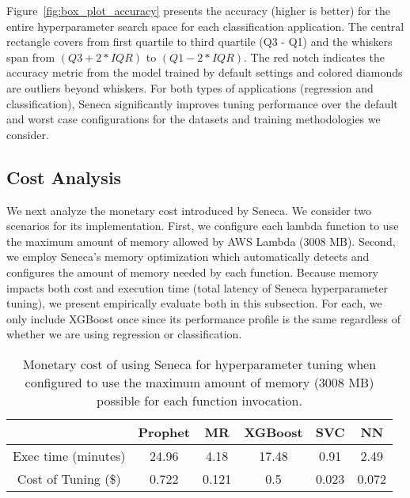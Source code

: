 Figure~\ref{fig:box_plot_accuracy} presents the accuracy (higher is better) 
for the entire hyperparameter search space for each classification
application.  The central rectangle covers from first quartile to third quartile (Q3 - Q1) and the whiskers span from \texttt{$(Q3 + 2 * IQR)$} to \texttt{$(Q1 - 2 * IQR)$}. The red notch indicates the accuracy metric from the model trained by default settings and colored diamonds are outliers beyond whiskers.
For both types of applications (regression and classification), Seneca significantly
improves tuning performance over the default and worst case configurations for the 
datasets and training methodologies we consider.  

\subsection{Cost Analysis}

We next analyze the monetary cost introduced by Seneca. 
We consider two scenarios for its implementation.
First, we configure each lambda function to use the maximum amount
of memory allowed by AWS Lambda (3008 MB).  Second, we employ Seneca's memory optimization 
which automatically detects and configures the amount of memory needed by each function.
Because memory impacts both cost and execution time (total latency of Seneca hyperparameter tuning), 
we present empirically evaluate both 
in this subsection.  For each, we only include XGBoost once since its 
performance profile is the same
regardless of whether we are using regression or classification.

\begin{table}
\centering
\begin{tabular}{|c|c|c|c|c|c|}
\hline
& Prophet & MR & XGBoost & SVC & NN\\
\hline
\hline
Exec time (minutes)& 24.96 & 4.18 & 17.48 & 0.91 & 2.49 \\
\hline
Cost of Tuning (\$) & 0.722 & 0.121 & 0.5 & 0.023 & 0.072 \\
\hline
\end{tabular}
\caption{ Monetary cost of using Seneca for hyperparameter tuning when configured to use the maximum amount of memory (3008 MB) possible for each function invocation. 
\label{tab:cost_max_memory}}
\vspace{-0.2in}
\end{table}

